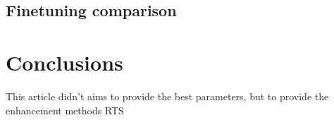 \documentclass[10pt,twocolumn,letterpaper]{article}
\begin{document}
\subsection{Finetuning comparison}
\label{subsec:4.3}






\section{Conclusions}
\label{sec:5}
This article didn't aims to provide the best parameters, but to provide the enhancement methods RTS 








{\small


}
\end{document}

